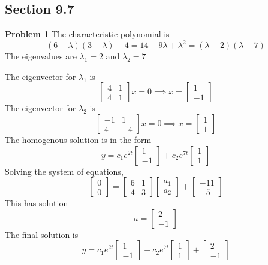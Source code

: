 \subsection*{Section 9.7}
\textbf{Problem 1}
The characteristic polynomial is 
\[
    (6-\lambda)(3-\lambda) - 4
    = 14 - 9\lambda + \lambda^2
    = (\lambda - 2)(\lambda-7)
\]
The eigenvalues are $\lambda_1 = 2$ and $\lambda_2 = 7$

The eigenvector for $\lambda_1$ is 
\[
    \begin{bmatrix}
        4 & 1 \\
        4 & 1
    \end{bmatrix} x = 0
    \implies x = 
    \begin{bmatrix}
        1 \\ -1
    \end{bmatrix}
\]
The eigenvector for $\lambda_2$ is 
\[
    \begin{bmatrix}
        -1 & 1 \\
        4 & -4
    \end{bmatrix} x = 0
    \implies x = 
    \begin{bmatrix}
        1 \\ 1
    \end{bmatrix}
\]
The homogenous solution is in the form 
\[
    y = c_1e^{2t} 
    \begin{bmatrix}
        1 \\ -1
    \end{bmatrix} +
    c_2e^{7t}
    \begin{bmatrix}
        1 \\ 1
    \end{bmatrix}
\]
Solving the system of equations,
\[
    \begin{bmatrix}
        0 \\
        0
    \end{bmatrix} = 
    \begin{bmatrix}
        6 & 1 \\
        4 & 3
    \end{bmatrix}
    \begin{bmatrix}
        a_1 \\
        a_2
    \end{bmatrix} +
     \begin{bmatrix}
         -11 \\ -5
     \end{bmatrix}
\]
This has solution 
\[
    a = \begin{bmatrix}
        2 \\ -1
    \end{bmatrix}
\]
The final solution is 
\[
    y = c_1e^{2t} 
    \begin{bmatrix}
        1 \\ -1
    \end{bmatrix} +
    c_2e^{7t}
    \begin{bmatrix}
        1 \\ 1
    \end{bmatrix}
    +
    \begin{bmatrix}
        2 \\ -1
    \end{bmatrix}
\]

